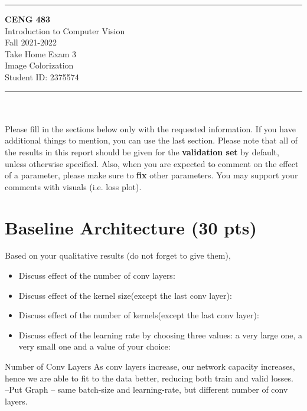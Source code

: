 \documentclass[12pt]{article}
\newcommand{\HRule}{\rule{\linewidth}{1mm}}
\begin{document}
\noindent
\HRule %
\small
\begin{center}
	\LARGE \textbf{CENG 483} \\[4mm]
	\Large Introduction to Computer Vision \\[4mm]
	\normalsize Fall 2021-2022 \\
	\Large Take Home Exam 3 \\
	\Large Image Colorization \\
    \Large Student ID: 2375574 \\
\end{center}
\HRule

\begin{center}
\end{center}
\vspace{-10mm}
\noindent\\ \\ 
Please fill in the sections below only with the requested information. If you have additional things to mention, you can use the last section. Please note that all of the results in this report should be given for the \textbf{validation set} by default, unless otherwise specified. Also, when you are expected to comment on the effect of a parameter, please make sure to \textbf{fix} other parameters. You may support your comments with visuals (i.e. loss plot).

\section{Baseline Architecture (30 pts)}
    Based on your qualitative results (do not forget to give them),
    \begin{itemize}
        \item Discuss effect of the number of conv layers:
        \item Discuss effect of the kernel size(except the last conv layer):
        \item Discuss effect of the number of kernels(except the last conv layer):
        \item Discuss effect of the learning rate by choosing three values: a very large one, a very small one and a value of your choice:

    \end{itemize}

    \begin{center}
        \raggedright
        Number of Conv Layers
        As conv layers increase, our network capacity increases, hence we are able to fit to the data better, reducing both train and valid losses. \\
        --Put Graph -- same batch-size and learning-rate, but different number of conv layers.
    \end{center}
\end{document}
